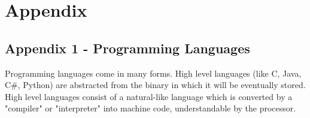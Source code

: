 \documentclass{report}
\begin{document}

	
	

\chapter*{Appendix}
\setcounter{page}{1}
\setcounter{section}{1}
\section{Appendix 1 -  Programming Languages}
Programming languages come in many forms. High level languages (like C, Java, C\#, Python) are abstracted from the binary in which it will be eventually stored. High level languages consist of a natural-like language which is converted by a "compiler" or "interpreter" into machine code, understandable by the processor.\newline \newline  \noindent
\end{document}
